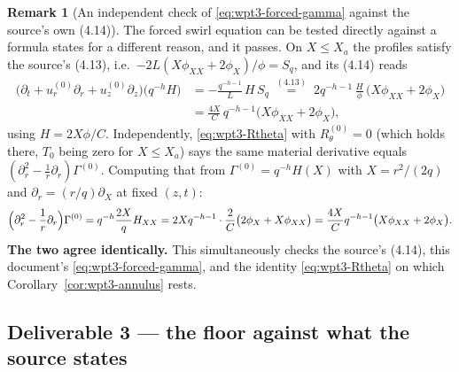 \documentclass[11pt]{article}
\theoremstyle{definition}
\newtheorem{remark}[theorem]{Remark}
\theoremstyle{remark}
\begin{document}
\begin{remark}[An independent check of \eqref{eq:wpt3-forced-gamma} against
  the source's own (4.14)]\label{rem:wpt3-414-check}
  The forced swirl equation can be tested directly against a formula
  \cite{OpenAI2026} states for a different reason, and it passes. On
  $X\leq X_a$ the profiles satisfy the source's (4.13), i.e.\
  $-2L(X\phi_{XX}+2\phi_X)/\phi=S_q$, and its (4.14) reads
  \[
    \begin{aligned}
      \bigl(\partial_t+u^{(0)}_r\partial_r+u^{(0)}_z\partial_z\bigr)
        \bigl(q^{-h}H\bigr)
      &=-\frac{q^{-h-1}}{L}\,H\,S_q
       \;\overset{(4.13)}{=}\;
       2q^{-h-1}\,\frac{H}{\phi}\,\bigl(X\phi_{XX}+2\phi_X\bigr)\\
      &=\frac{4X}{C}\,q^{-h-1}\bigl(X\phi_{XX}+2\phi_X\bigr),
    \end{aligned}
  \]
  using $H=2X\phi/C$. Independently, \eqref{eq:wpt3-Rtheta} with
  $R^{(0)}_\theta=0$ (which holds there, $T_0$ being zero for $X\leq X_a$)
  says the same material derivative equals
  $(\partial_r^2-\tfrac1r\partial_r)\Gamma^{(0)}$. Computing that from
  $\Gamma^{(0)}=q^{-h}H(X)$ with $X=r^2/(2q)$ and $\partial_r=(r/q)\partial_X$
  at fixed $(z,t)$:
  \[
    \Bigl(\partial_r^2-\frac1r\partial_r\Bigr)\Gamma^{(0)}
      =q^{-h}\frac{2X}{q}H_{XX}
      =2Xq^{-h-1}\cdot\frac{2}{C}\bigl(2\phi_X+X\phi_{XX}\bigr)
      =\frac{4X}{C}q^{-h-1}\bigl(X\phi_{XX}+2\phi_X\bigr).
  \]
  \textbf{The two agree identically.} This simultaneously checks the source's
  (4.14), this document's \eqref{eq:wpt3-forced-gamma}, and the identity
  \eqref{eq:wpt3-Rtheta} on which Corollary~\ref{cor:wpt3-annulus} rests.
\end{remark}

\subsection{Deliverable 3 --- the floor against what the source states}
\label{subsec:wpt3-compare}
\end{document}

